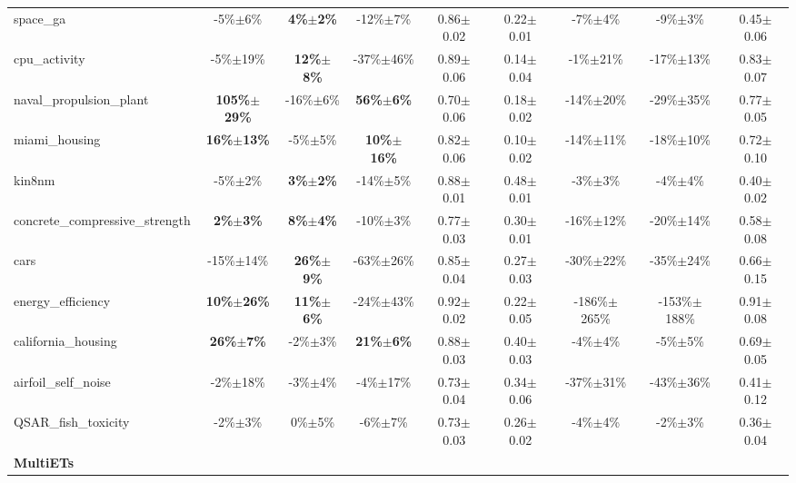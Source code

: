 \begin{table}
\begin{small}
\begin{sc}
{\begin{tabular}{lcccccccc}
space\_ga  &  -5\%$\pm$6\%  &  \textbf{4\%$\pm$2\%}  &  -12\%$\pm$7\%  &  0.86$\pm$0.02  &  0.22$\pm$0.01  &  -7\%$\pm$4\%  &  -9\%$\pm$3\%  &  0.45$\pm$0.06 \\
cpu\_activity  &  -5\%$\pm$19\%  &  \textbf{12\%$\pm$8\%}  &  -37\%$\pm$46\%  &  0.89$\pm$0.06  &  0.14$\pm$0.04  &  -1\%$\pm$21\%  &  -17\%$\pm$13\%  &  0.83$\pm$0.07 \\
naval\_propulsion\_plant  &  \textbf{105\%$\pm$29\%}  &  -16\%$\pm$6\%  &  \textbf{56\%$\pm$6\%}  &  0.70$\pm$0.06  &  0.18$\pm$0.02  &  -14\%$\pm$20\%  &  -29\%$\pm$35\%  &  0.77$\pm$0.05 \\
miami\_housing  &  \textbf{16\%$\pm$13\%}  &  -5\%$\pm$5\%  &  \textbf{10\%$\pm$16\%}  &  0.82$\pm$0.06  &  0.10$\pm$0.02  &  -14\%$\pm$11\%  &  -18\%$\pm$10\%  &  0.72$\pm$0.10 \\
kin8nm  &  -5\%$\pm$2\%  &  \textbf{3\%$\pm$2\%}  &  -14\%$\pm$5\%  &  0.88$\pm$0.01  &  0.48$\pm$0.01  &  -3\%$\pm$3\%  &  -4\%$\pm$4\%  &  0.40$\pm$0.02 \\
concrete\_compressive\_strength  &  \textbf{2\%$\pm$3\%}  &  \textbf{8\%$\pm$4\%}  &  -10\%$\pm$3\%  &  0.77$\pm$0.03  &  0.30$\pm$0.01  &  -16\%$\pm$12\%  &  -20\%$\pm$14\%  &  0.58$\pm$0.08 \\
cars  &  -15\%$\pm$14\%  &  \textbf{26\%$\pm$9\%}  &  -63\%$\pm$26\%  &  0.85$\pm$0.04  &  0.27$\pm$0.03  &  -30\%$\pm$22\%  &  -35\%$\pm$24\%  &  0.66$\pm$0.15 \\
energy\_efficiency  &  \textbf{10\%$\pm$26\%}  &  \textbf{11\%$\pm$6\%}  &  -24\%$\pm$43\%  &  0.92$\pm$0.02  &  0.22$\pm$0.05  &  -186\%$\pm$265\%  &  -153\%$\pm$188\%  &  0.91$\pm$0.08 \\
california\_housing  &  \textbf{26\%$\pm$7\%}  &  -2\%$\pm$3\%  &  \textbf{21\%$\pm$6\%}  &  0.88$\pm$0.03  &  0.40$\pm$0.03  &  -4\%$\pm$4\%  &  -5\%$\pm$5\%  &  0.69$\pm$0.05 \\
airfoil\_self\_noise  &  -2\%$\pm$18\%  &  -3\%$\pm$4\%  &  -4\%$\pm$17\%  &  0.73$\pm$0.04  &  0.34$\pm$0.06  &  -37\%$\pm$31\%  &  -43\%$\pm$36\%  &  0.41$\pm$0.12 \\
QSAR\_fish\_toxicity  &  -2\%$\pm$3\%  &  0\%$\pm$5\%  &  -6\%$\pm$7\%  &  0.73$\pm$0.03  &  0.26$\pm$0.02  &  -4\%$\pm$4\%  &  -2\%$\pm$3\%  &  0.36$\pm$0.04 \\
\cmidrule(lr){1-9}
\textbf{MultiETs} & & & & & & & & \\ \cmidrule(lr){1-9}


\end{tabular}}
\end{sc}
\end{small}
\end{table}

